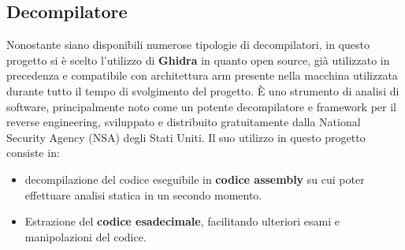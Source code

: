             
                


\subsection{Decompilatore}
Nonostante siano disponibili numerose tipologie di decompilatori, in questo progetto si è scelto l'utilizzo di \textbf{Ghidra} in quanto open source, già utilizzato in precedenza e compatibile con architettura arm presente nella macchina utilizzata durante tutto il tempo di svolgimento del progetto. È uno strumento di analisi di software, principalmente noto come un potente decompilatore e framework per il reverse engineering, sviluppato e distribuito gratuitamente dalla National Security Agency (NSA) degli Stati Uniti. Il suo utilizzo in questo progetto consiste in:
\begin{itemize}
    \item decompilazione del codice eseguibile in \textbf{codice assembly} su cui poter effettuare analisi statica in un secondo momento. 
    \item Estrazione del \textbf{codice esadecimale}, facilitando ulteriori esami e manipolazioni del codice.
\end{itemize}

